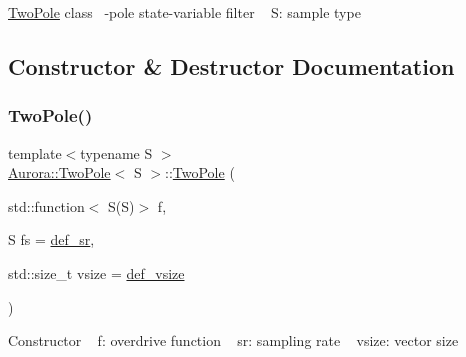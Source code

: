 \hyperlink{class_aurora_1_1_two_pole}{Two\+Pole} class ~-\/pole state-\/variable filter ~\newline
S\+: sample type 

\subsection{Constructor \& Destructor Documentation}
\mbox{\label{class_aurora_1_1_two_pole_a0545f0b722b88873bb798b6c0f2112e8}} 
\subsubsection{\texorpdfstring{Two\+Pole()}{TwoPole()}\hspace{0.1cm}{\footnotesize\ttfamily [1/2]}}
{\footnotesize\ttfamily template$<$typename S $>$ \\
\hyperlink{class_aurora_1_1_two_pole}{Aurora\+::\+Two\+Pole}$<$ S $>$\+::\hyperlink{class_aurora_1_1_two_pole}{Two\+Pole} (\begin{DoxyParamCaption}\item[{std\+::function$<$ S(S)$>$}]{f,  }\item[{S}]{fs = {\ttfamily \hyperlink{namespace_aurora_ad49263d809bea98dd422e95bc91bc03e}{def\+\_\+sr}},  }\item[{std\+::size\+\_\+t}]{vsize = {\ttfamily \hyperlink{namespace_aurora_afaaddf667a06e7ce23c667a8b7295263}{def\+\_\+vsize}} }\end{DoxyParamCaption})\hspace{0.3cm}{\ttfamily [inline]}}

Constructor ~\newline
f\+: overdrive function ~\newline
sr\+: sampling rate ~\newline
vsize\+: vector size \mbox{\label{class_aurora_1_1_two_pole_afb7af09d7f8a80b18d875e78f4bcb419}} 
